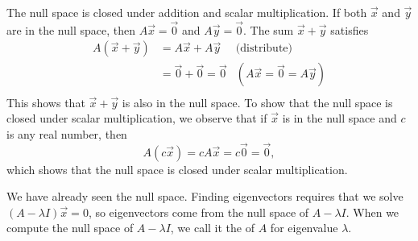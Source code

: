 The null space is closed under addition and scalar multiplication.  If both $\vec x$ and $\vec y$ are in the null space, then $A\vec x=\vec 0$ and $A\vec y=\vec 0$. The sum $\vec x+\vec y$ satisfies 
\begin{align*}
A(\vec x+\vec y)
&= A\vec x+A\vec y &\text{(distribute)}\\
&= \vec 0 +\vec 0 = \vec 0 &(A\vec x = \vec 0 =A\vec y)\\
\end{align*}
This shows that $\vec x+\vec y$ is also in the null space.  
To show that the null space is closed under scalar multiplication, we observe that if $\vec x$ is in the null space and $c$ is any real number, then $$A(c\vec x) = cA\vec x = c\vec 0 = \vec 0,$$
which shows that the null space is closed under scalar multiplication.

We have already seen the null space. Finding eigenvectors requires that we solve $(A-\lambda I)\vec x = 0$, so eigenvectors come from the null space of $A-\lambda I$.  When we compute the null space of $A-\lambda I$, we call it the  of $A$ for eigenvalue $\lambda$.


